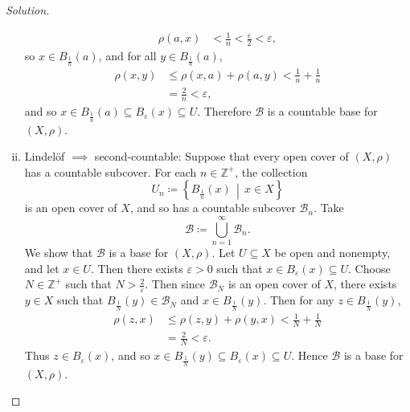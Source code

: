 \documentclass[12pt]{article}
\newcommand{\z}{\mathbb{Z}}
\newcommand\setb[1]{\left \{ #1 \right \}}
\newcommand{\eps}{\varepsilon}
\theoremstyle{definition}
\begin{document}
\begin{proof}[Solution]
\begin{enumerate}[(i)]
        \begin{align*}
            \rho(a,x) & < \frac{1}{n} < \frac{\eps}{2} < \eps,
        \end{align*}
        so $x \in B_{\frac{1}{n}}(a)$, and for all $y \in B_{\frac{1}{n}}(a)$,
        \begin{align*}
            \rho(x,y) & \leq \rho(x,a) + \rho(a,y) < \frac{1}{n} + \frac{1}{n} \\
            & = \frac{2}{n} < \eps,
        \end{align*}
        and so $x \in B_{\frac{1}{n}}(a) \subseteq B_{\eps}(x) \subseteq U$. Therefore $\mathcal{B}$ is a countable base for $(X,\rho)$.
        \item Lindel\"of $\implies$ second-countable: Suppose that every open cover of $(X,\rho)$ has a countable subcover. For each $n \in \z^+$, the collection 
        \[
            U_n \coloneqq \setb{ B_{\frac{1}{n}}(x) \, \middle| \, x \in X }
        \]
        is an open cover of $X$, and so has a countable subcover $\mathcal{B}_n$. Take 
        \[
            \mathcal{B} \coloneqq \bigcup\limits_{n = 1}^{\infty} \mathcal{B}_n.
        \]
        We show that $\mathcal{B}$ is a base for $(X,\rho)$. Let $U \subseteq X$ be open and nonempty, and let $x \in U$. Then there exists $\eps > 0$ such that $x \in B_{\eps}(x) \subseteq U$. Choose $N \in \z^+$ such that $N > \frac{2}{\eps}$. Then since $\mathcal{B}_N$ is an open cover of $X$, there exists $y \in X$ such that $B_{\frac{1}{N}}(y) \in \mathcal{B}_N$ and $x \in B_{\frac{1}{N}}(y)$. Then for any $z \in B_{\frac{1}{N}}(y)$, 
        \begin{align*}
            \rho(z,x) & \leq \rho(z,y) + \rho(y,x) < \frac{1}{N} + \frac{1}{N} \\
            & = \frac{2}{N} < \eps.
        \end{align*}
        Thus $z \in B_{\eps}(x)$, and so $x \in B_{\frac{1}{N}}(y) \subseteq B_{\eps}(x) \subseteq U$. Hence $\mathcal{B}$ is a base for $(X,\rho)$.
    \end{enumerate}
\end{proof}
\end{document}
